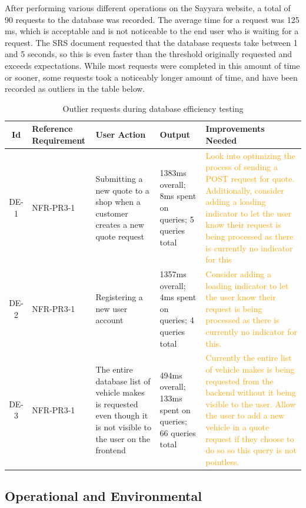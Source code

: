\documentclass[12pt, titlepage]{article}
\begin{document}
\noindent After performing various different operations on the Sayyara website, a total of 90 requests to the database was recorded. The average time for a request was 125 ms, which is acceptable and is not noticeable to the end user who is waiting for a request. The SRS document requested that the database requests take between 1 and 5 seconds, so this is even faster than the threshold originally requested and exceeds expectations. While most requests were completed in this amount of time or sooner, some requests took a noticeably longer amount of time, and have been recorded as outliers in the table below. 

\begin{table}[H]
    \centering
    \begin{tabularx}{\textwidth}{|c|p{2.3cm}|p{3cm}|X|p{3cm}|}
        \hline
        Id & Reference Requirement & User Action & Output & Improvements Needed \\ \hline
        DE-1 & NFR-PR3-1 & Submitting a new quote to a shop when a customer creates a new quote request & 1383ms overall; 8ms spent on queries; 5 queries total & \textcolor{orange}{Look into optimizing the process of sending a POST request for quote. Additionally, consider adding a loading indicator to let the user know their request is being processed as there is currently no indicator for this} \\ \hline
        DE-2 & NFR-PR3-1 & Registering a new user account & 1357ms overall; 4ms spent on queries; 4 queries total & \textcolor{orange}{Consider adding a loading indicator to let the user know their request is being processed as there is currently no indicator for this.} \\ \hline
        DE-3 & NFR-PR3-1 & The entire database list of vehicle makes is requested even though it is not visible to the user on the frontend & 494ms overall; 133ms spent on queries; 66 queries total & \textcolor{orange}{Currently the entire list of vehicle makes is being requested from the backend without it being visible to the user. Allow the user to add a new vehicle in a quote request if they choose to do so so this query is not pointless.} \\ \hline
    \end{tabularx}
    \caption{Outlier requests during database efficiency testing}
\end{table}

\subsection{Operational and Environmental}
\end{document}
